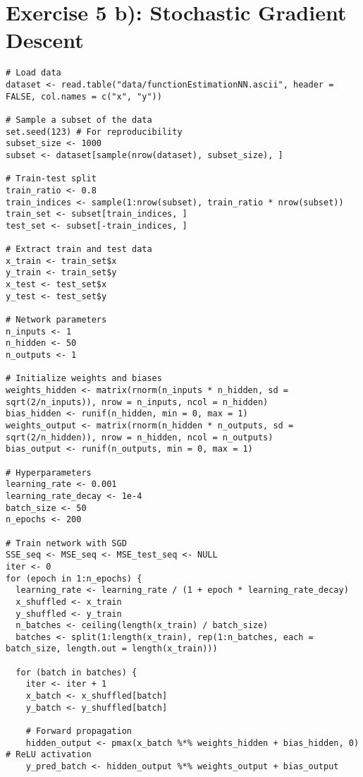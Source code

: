 \vspace{10mm}
\section*{Exercise 5 b): Stochastic Gradient Descent}
\begin{tcolorbox}[colback=white!95!black,colframe=white!50!black,breakable]
\begin{lstlisting}[caption={Exercise 5b}, label={lst:sgd}]
# Load data
dataset <- read.table("data/functionEstimationNN.ascii", header = FALSE, col.names = c("x", "y"))

# Sample a subset of the data
set.seed(123) # For reproducibility
subset_size <- 1000
subset <- dataset[sample(nrow(dataset), subset_size), ]

# Train-test split
train_ratio <- 0.8
train_indices <- sample(1:nrow(subset), train_ratio * nrow(subset))
train_set <- subset[train_indices, ]
test_set <- subset[-train_indices, ]

# Extract train and test data
x_train <- train_set$x
y_train <- train_set$y
x_test <- test_set$x
y_test <- test_set$y

# Network parameters
n_inputs <- 1
n_hidden <- 50
n_outputs <- 1

# Initialize weights and biases
weights_hidden <- matrix(rnorm(n_inputs * n_hidden, sd = sqrt(2/n_inputs)), nrow = n_inputs, ncol = n_hidden)
bias_hidden <- runif(n_hidden, min = 0, max = 1)
weights_output <- matrix(rnorm(n_hidden * n_outputs, sd = sqrt(2/n_hidden)), nrow = n_hidden, ncol = n_outputs)
bias_output <- runif(n_outputs, min = 0, max = 1)

# Hyperparameters
learning_rate <- 0.001
learning_rate_decay <- 1e-4
batch_size <- 50
n_epochs <- 200

# Train network with SGD
SSE_seq <- MSE_seq <- MSE_test_seq <- NULL
iter <- 0
for (epoch in 1:n_epochs) {
  learning_rate <- learning_rate / (1 + epoch * learning_rate_decay)
  x_shuffled <- x_train
  y_shuffled <- y_train
  n_batches <- ceiling(length(x_train) / batch_size)
  batches <- split(1:length(x_train), rep(1:n_batches, each = batch_size, length.out = length(x_train)))
  
  for (batch in batches) {
    iter <- iter + 1
    x_batch <- x_shuffled[batch]
    y_batch <- y_shuffled[batch]
    
    # Forward propagation
    hidden_output <- pmax(x_batch %*% weights_hidden + bias_hidden, 0) # ReLU activation
    y_pred_batch <- hidden_output %*% weights_output + bias_output
    

\end{lstlisting}
\end{tcolorbox}
